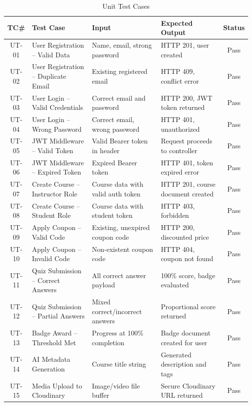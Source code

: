 \begin{table}[H]
\centering
\renewcommand{\arraystretch}{1.4}
\begin{tabular}{|c|p{3.5cm}|p{3.5cm}|p{2.5cm}|c|}
\hline
\textbf{TC\#} & \textbf{Test Case} & \textbf{Input} & \textbf{Expected Output} & \textbf{Status} \\
\hline
UT-01 & User Registration -- Valid Data          & Name, email, strong password          & HTTP 201, user created             & Pass \\
UT-02 & User Registration -- Duplicate Email     & Existing registered email             & HTTP 409, conflict error           & Pass \\
UT-03 & User Login -- Valid Credentials          & Correct email and password            & HTTP 200, JWT token returned       & Pass \\
UT-04 & User Login -- Wrong Password             & Correct email, wrong password         & HTTP 401, unauthorized             & Pass \\
UT-05 & JWT Middleware -- Valid Token            & Valid Bearer token in header          & Request proceeds to controller     & Pass \\
UT-06 & JWT Middleware -- Expired Token          & Expired Bearer token                  & HTTP 401, token expired error      & Pass \\
UT-07 & Create Course -- Instructor Role         & Course data with valid auth token     & HTTP 201, course document created  & Pass \\
UT-08 & Create Course -- Student Role            & Course data with student token        & HTTP 403, forbidden                & Pass \\
UT-09 & Apply Coupon -- Valid Code               & Existing, unexpired coupon code       & HTTP 200, discounted price         & Pass \\
UT-10 & Apply Coupon -- Invalid Code             & Non-existent coupon code              & HTTP 404, coupon not found         & Pass \\
UT-11 & Quiz Submission -- Correct Answers       & All correct answer payload            & 100\% score, badge evaluated       & Pass \\
UT-12 & Quiz Submission -- Partial Answers       & Mixed correct/incorrect answers       & Proportional score returned        & Pass \\
UT-13 & Badge Award -- Threshold Met             & Progress at 100\% completion          & Badge document created for user    & Pass \\
UT-14 & AI Metadata Generation                   & Course title string                   & Generated description and tags     & Pass \\
UT-15 & Media Upload to Cloudinary               & Image/video file buffer               & Secure Cloudinary URL returned     & Pass \\
\hline
\end{tabular}
\caption{Unit Test Cases}
\label{tab:unit-tests}
\end{table}


